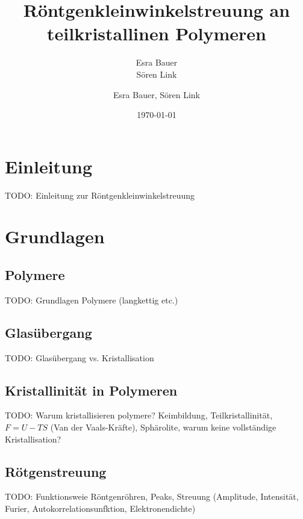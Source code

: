 \documentclass[bigchapter,colorback,accentcolor=tud4b,linedtoc,11pt]{tudreport}
\title{Röntgenkleinwinkelstreuung an teilkristallinen Polymeren}
\subtitle{Esra Bauer  \\Sören Link}
\author{Esra Bauer, Sören Link}
\date{\today}
\begin{document}

\maketitle

\tableofcontents


\chapter{Einleitung}
TODO: Einleitung zur Röntgenkleinwinkelstreuung

\chapter{Grundlagen}
\section{Polymere}
TODO: Grundlagen Polymere (langkettig etc.)

\section{Glasübergang}
TODO: Glasübergang vs. Kristallisation

\section{Kristallinität in Polymeren}
TODO: Warum kristallisieren polymere? Keimbildung, Teilkristallinität, $F = U - TS$ (Van der Vaals-Kräfte), Sphärolite, warum keine vollständige Kristallisation?

\section{Rötgenstreuung}
TODO: Funktionsweie Röntgenröhren, Peaks, Streuung (Amplitude, Intensität, Furier, Autokorrelationsunfktion, Elektronendichte)
\end{document}
